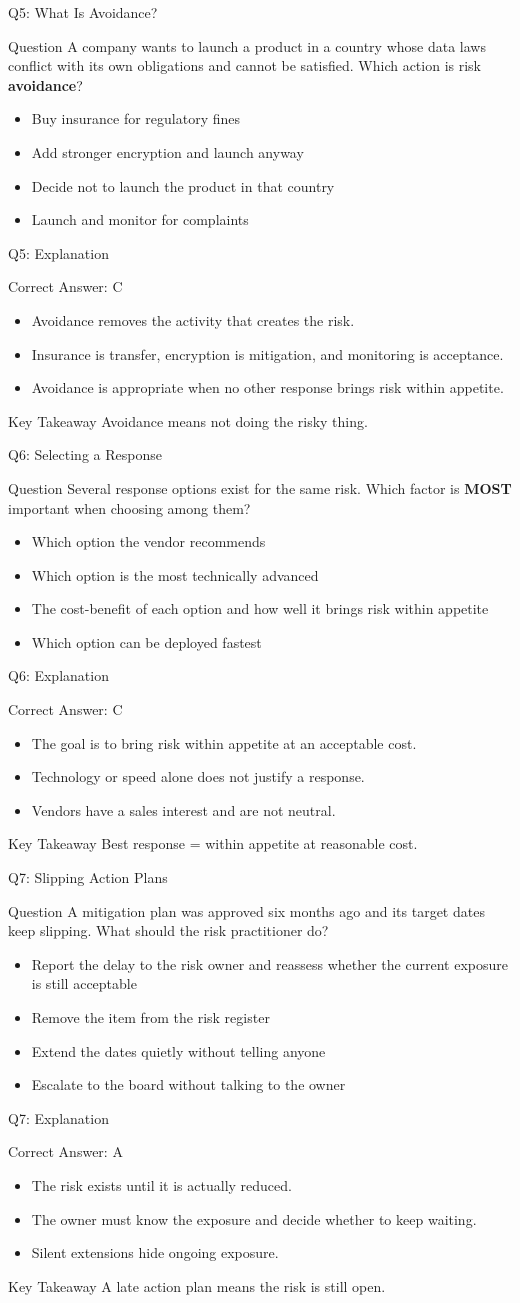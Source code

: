 \documentclass[aspectratio=169]{beamer}
\newcommand{\hq}[7]{%
	\begin{frame}{Q#1: #2}
		\begin{block}{Question}
			#3
		\end{block}
		\begin{itemize}
			#4
		\end{itemize}
	\end{frame}
	\begin{frame}{Q#1: Explanation}
		\begin{block}{Correct Answer: #5}
			\begin{itemize}
				#6
			\end{itemize}
		\end{block}
		\begin{alertblock}{Key Takeaway}
			#7
		\end{alertblock}
	\end{frame}
}
\begin{document}
	\hq{5}{What Is Avoidance?}
	{A company wants to launch a product in a country whose data laws conflict with its own obligations and cannot be satisfied. Which action is risk \textbf{avoidance}?}
	{\item[\textbf{(A)}] Buy insurance for regulatory fines
		\item[\textbf{(B)}] Add stronger encryption and launch anyway
		\item[\textbf{(C)}] Decide not to launch the product in that country
		\item[\textbf{(D)}] Launch and monitor for complaints}
	{C}
	{\item Avoidance removes the activity that creates the risk.
		\item Insurance is transfer, encryption is mitigation, and monitoring is acceptance.
		\item Avoidance is appropriate when no other response brings risk within appetite.}
	{Avoidance means not doing the risky thing.}
	
	\hq{6}{Selecting a Response}
	{Several response options exist for the same risk. Which factor is \textbf{MOST} important when choosing among them?}
	{\item[\textbf{(A)}] Which option the vendor recommends
		\item[\textbf{(B)}] Which option is the most technically advanced
		\item[\textbf{(C)}] The cost-benefit of each option and how well it brings risk within appetite
		\item[\textbf{(D)}] Which option can be deployed fastest}
	{C}
	{\item The goal is to bring risk within appetite at an acceptable cost.
		\item Technology or speed alone does not justify a response.
		\item Vendors have a sales interest and are not neutral.}
	{Best response = within appetite at reasonable cost.}
	
	\hq{7}{Slipping Action Plans}
	{A mitigation plan was approved six months ago and its target dates keep slipping. What should the risk practitioner do?}
	{\item[\textbf{(A)}] Report the delay to the risk owner and reassess whether the current exposure is still acceptable
		\item[\textbf{(B)}] Remove the item from the risk register
		\item[\textbf{(C)}] Extend the dates quietly without telling anyone
		\item[\textbf{(D)}] Escalate to the board without talking to the owner}
	{A}
	{\item The risk exists until it is actually reduced.
		\item The owner must know the exposure and decide whether to keep waiting.
		\item Silent extensions hide ongoing exposure.}
	{A late action plan means the risk is still open.}
	
\end{document}
